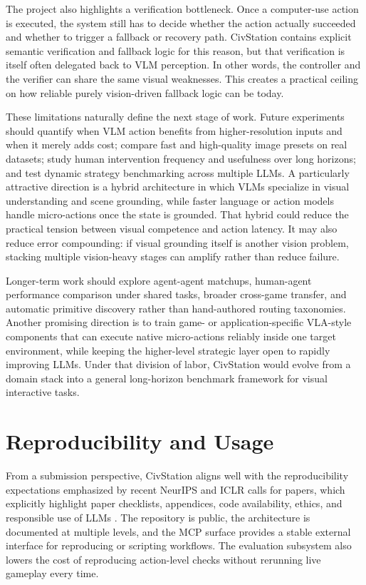 The project also highlights a verification bottleneck. Once a computer-use action is executed, the system still has to decide whether the action actually succeeded and whether to trigger a fallback or recovery path. CivStation contains explicit semantic verification and fallback logic for this reason, but that verification is itself often delegated back to VLM perception. In other words, the controller and the verifier can share the same visual weaknesses. This creates a practical ceiling on how reliable purely vision-driven fallback logic can be today.

These limitations naturally define the next stage of work. Future experiments should quantify when VLM action benefits from higher-resolution inputs and when it merely adds cost; compare fast and high-quality image presets on real datasets; study human intervention frequency and usefulness over long horizons; and test dynamic strategy benchmarking across multiple LLMs. A particularly attractive direction is a hybrid architecture in which VLMs specialize in visual understanding and scene grounding, while faster language or action models handle micro-actions once the state is grounded. That hybrid could reduce the practical tension between visual competence and action latency. It may also reduce error compounding: if visual grounding itself is another vision problem, stacking multiple vision-heavy stages can amplify rather than reduce failure.

Longer-term work should explore agent-agent matchups, human-agent performance comparison under shared tasks, broader cross-game transfer, and automatic primitive discovery rather than hand-authored routing taxonomies. Another promising direction is to train game- or application-specific VLA-style components that can execute native micro-actions reliably inside one target environment, while keeping the higher-level strategic layer open to rapidly improving LLMs. Under that division of labor, CivStation would evolve from a domain stack into a general long-horizon benchmark framework for visual interactive tasks.

\section{Reproducibility and Usage}

From a submission perspective, CivStation aligns well with the reproducibility expectations emphasized by recent NeurIPS and ICLR calls for papers, which explicitly highlight paper checklists, appendices, code availability, ethics, and responsible use of LLMs \cite{neurips_cfp, iclr_cfp}. The repository is public, the architecture is documented at multiple levels, and the MCP surface provides a stable external interface for reproducing or scripting workflows. The evaluation subsystem also lowers the cost of reproducing action-level checks without rerunning live gameplay every time.

